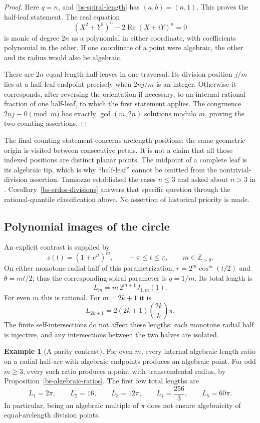 \documentclass[11pt,a4paper]{article}
\theoremstyle{definition}
\newtheorem{example}[theorem]{Example}
\theoremstyle{remark}
\numberwithin{equation}{section}
\begin{document}
\begin{proof}
Here $q=n$, and \eqref{bs-spiral-length} has $(a,b)=(n,1)$.
This proves the half-leaf statement.  The real equation
\[
 (X^2+Y^2)^n-2\operatorname{Re}(X+iY)^n=0
\]
is monic of degree $2n$ as a polynomial in either coordinate, with
coefficients polynomial in the other.  If one coordinate of a point
were algebraic, the other and its radius would also be algebraic.

There are $2n$ equal-length half-leaves in one traversal.  Its division
position $j/m$ lies at a half-leaf endpoint precisely when
$2nj/m$ is an integer.  Otherwise it corresponds, after reversing the
orientation if necessary, to an internal rational fraction of one
half-leaf, to which the first statement applies.
The congruence $2nj\equiv0\pmod m$ has exactly $\gcd(m,2n)$ solutions
modulo $m$, proving the two counting assertions.
\end{proof}

The final counting statement concerns arclength positions: the same
geometric origin is visited between consecutive petals.  It is not a
claim that all those indexed positions are distinct planar points.
The midpoint of a complete leaf is its algebraic tip, which is why
``half-leaf'' cannot be omitted from the nontrivial-division assertion.
Tamiozzo established the cases $n\le3$ and asked about $n>3$ in
\cite[Remark~5.7]{lm-Tamiozzo}.  Corollary~\ref{bs-erdos-divisions}
answers that specific question through the rational-quantile
classification above.  No assertion of historical priority is made.

\subsection{Polynomial images of the circle}

An explicit contrast is supplied by
\[
 z(t)=(1+e^{it})^m,\qquad -\pi\le t\le\pi,
 \qquad m\in\mathbb Z_{>0}.
\]
On either monotone radial half of this parametrization,
$r=2^m\cos^m(t/2)$ and $\theta=mt/2$; thus the corresponding
spiral parameter is $q=1/m$.  Its total length is
\[
 L_m=m\,2^{m+1}J_{1,m}(1).
\]
For even $m$ this is rational.  For $m=2k+1$ it is
\[
 L_{2k+1}=2(2k+1)\binom{2k}{k}\pi.
\]
The finite self-intersections do not affect these lengths: each
monotone radial half is injective, and any intersections between the
two halves are isolated.

\begin{example}[A parity contrast]
\label{bs-circle-powers}
For even $m$, every internal algebraic length ratio on a radial
half-arc with algebraic endpoints produces an algebraic point.  For
odd $m\ge3$, every such ratio produces a point with transcendental
radius, by Proposition~\ref{bs-algebraic-ratios}.
The first few total lengths are
\[
 L_1=2\pi,\qquad L_2=16,\qquad L_3=12\pi,
 \qquad L_4=\frac{256}{3},\qquad L_5=60\pi.
\]
In particular, being an algebraic multiple of $\pi$ does not ensure
algebraicity of equal-arclength division points.
\end{example}
\end{document}
